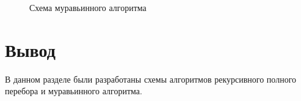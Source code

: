 \begin{figure}
	\caption{Схема муравьинного алгоритма}
	\label{2}
\end{figure}

\newpage
\section{Вывод}
В данном разделе были разработаны схемы алгоритмов рекурсивного полного перебора и муравьинного алгоритма.